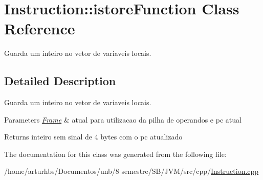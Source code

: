 \hypertarget{classInstruction_1_1istoreFunction}{}\section{Instruction\+:\+:istore\+Function Class Reference}
\label{classInstruction_1_1istoreFunction}


Guarda um inteiro no vetor de variaveis locais.  




\subsection{Detailed Description}
Guarda um inteiro no vetor de variaveis locais. 


\begin{DoxyParams}{Parameters}
{\em \hyperlink{classFrame}{Frame}} & atual para utilizacao da pilha de operandos e pc atual \\
\hline
\end{DoxyParams}
\begin{DoxyReturn}{Returns}
inteiro sem sinal de 4 bytes com o pc atualizado 
\end{DoxyReturn}


The documentation for this class was generated from the following file\+:\begin{DoxyCompactItemize}
\item 
/home/arturhbs/\+Documentos/unb/8 semestre/\+S\+B/\+J\+V\+M/src/cpp/\hyperlink{Instruction_8cpp}{Instruction.\+cpp}\end{DoxyCompactItemize}
